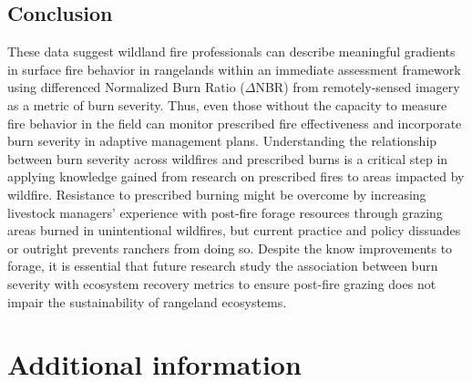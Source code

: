 \documentclass[fire,article,submit,oneauthor,pdftex]{Definitions/mdpi}
\begin{document}
\subsection{Conclusion}

These data suggest wildland fire professionals can describe meaningful gradients in surface fire behavior in rangelands within an immediate assessment framework using differenced Normalized Burn Ratio ($\Delta$NBR) from remotely-sensed imagery as a metric of burn severity. 
Thus, even those without the capacity to measure fire behavior in the field can monitor prescribed fire effectiveness and incorporate burn severity in adaptive management plans. 
Understanding the relationship between burn severity across wildfires and prescribed burns is a critical step in applying knowledge gained from research on prescribed fires to areas impacted by wildfire. 
Resistance to prescribed burning might be overcome by increasing livestock managers' experience with post-fire forage resources through grazing areas burned in unintentional wildfires, but current practice and policy dissuades or outright prevents ranchers from doing so.
Despite the know improvements to forage, it is essential that future research study the association between burn severity with ecosystem recovery metrics to ensure post-fire grazing does not impair the sustainability of rangeland ecosystems. 


\vspace{6pt}






\appendixstart
\appendix
 \section{Additional information}
\end{document}
